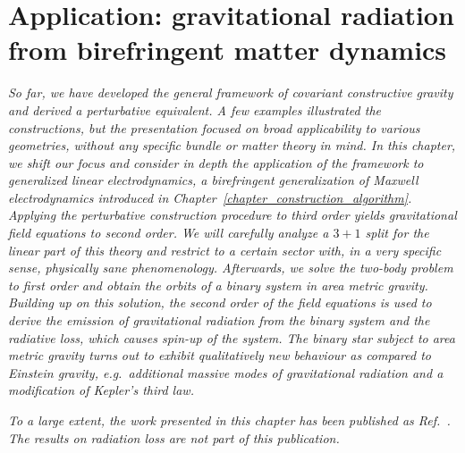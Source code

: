 \chapter{Application: gravitational radiation from birefringent matter dynamics}
\label{chapter_weak_area}

\textit{So far, we have developed the general framework of covariant constructive gravity and derived a perturbative equivalent. A few examples illustrated the constructions, but the presentation focused on broad applicability to various geometries, without any specific bundle or matter theory in mind. In this chapter, we shift our focus and consider in depth the application of the framework to generalized linear electrodynamics, a birefringent generalization of Maxwell electrodynamics introduced in Chapter~\ref{chapter_construction_algorithm}. Applying the perturbative construction procedure to third order yields gravitational field equations to second order. We will carefully analyze a $3+1$ split for the linear part of this theory and restrict to a certain sector with, in a very specific sense, physically sane phenomenology. Afterwards, we solve the two-body problem to first order and obtain the orbits of a binary system in area metric gravity. Building up on this solution, the second order of the field equations is used to derive the emission of gravitational radiation from the binary system and the radiative loss, which causes spin-up of the system. The binary star subject to area metric gravity turns out to exhibit qualitatively new behaviour as compared to Einstein gravity, e.g.~additional massive modes of gravitational radiation and a modification of Kepler's third law.}

\textit{To a large extent, the work presented in this chapter has been published as Ref.\ \cite{Alex_2020_2}. The results on radiation loss are not part of this publication.}

